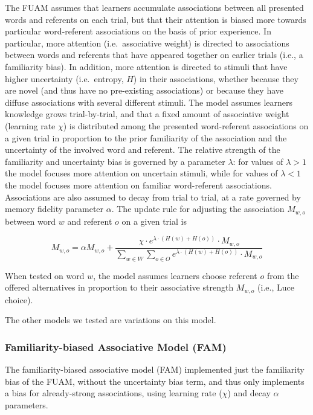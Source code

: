 \documentclass[10pt, letterpaper]{article}
\begin{document}
The FUAM assumes that learners accumulate associations between all
presented words and referents on each trial, but that their attention is
biased more towards particular word-referent associations on the basis
of prior experience. In particular, more attention (i.e.~associative
weight) is directed to associations between words and referents that
have appeared together on earlier trials (i.e., a familiarity bias). In
addition, more attention is directed to stimuli that have higher
uncertainty (i.e.~entropy, \(H\)) in their associations, whether because
they are novel (and thus have no pre-existing associations) or because
they have diffuse associations with several different stimuli. The model
assumes learners knowledge grows trial-by-trial, and that a fixed amount
of associative weight (learning rate \(\chi\)) is distributed among the
presented word-referent associations on a given trial in proportion to
the prior familiarity of the association and the uncertainty of the
involved word and referent. The relative strength of the familiarity and
uncertainty bias is governed by a parameter \(\lambda\): for values of
\(\lambda>1\) the model focuses more attention on uncertain stimuli,
while for values of \(\lambda<1\) the model focuses more attention on
familiar word-referent associations. Associations are also assumed to
decay from trial to trial, at a rate governed by memory fidelity
parameter \(\alpha\). The update rule for adjusting the association
\(M_{w,o}\) between word \(w\) and referent \(o\) on a given trial is

\begin{equation}
M_{w,o} =  \alpha M_{w,o} + \frac{ \chi \cdot e^{ \lambda \cdot (H(w) + H(o)) } \cdot M_{w,o}  }{  \sum_{w\in W} \sum_{o\in O} e^{ \lambda \cdot (H(w) + H(o)) } \cdot M_{w,o} }
\label{eq:fullmodel}
\end{equation}

When tested on word \(w\), the model assumes learners choose referent
\(o\) from the offered alternatives in proportion to their associative
strength \(M_{w,o}\) (i.e., Luce choice).

The other models we tested are variations on this model.

\subsubsection{Familiarity-biased Associative Model
(FAM)}\label{familiarity-biased-associative-model-fam}

The familiarity-biased associative model (FAM) implemented just the
familiarity bias of the FUAM, without the uncertainty bias term, and
thus only implements a bias for already-strong associations, using
learning rate (\(\chi\)) and decay \(\alpha\) parameters.
\end{document}
